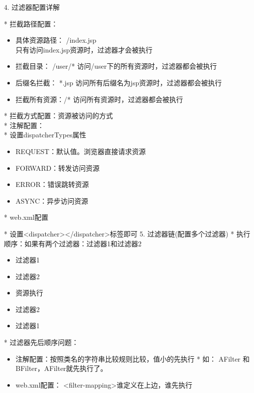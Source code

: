 \documentclass{article}
\begin{document}
  4. 过滤器配置详解

    * 拦截路径配置：
     \begin{itemize}
    \item 具体资源路径： /index.jsp \\只有访问index.jsp资源时，过滤器才会被执行
    \item  拦截目录： /user/*  访问/user下的所有资源时，过滤器都会被执行
    \item 后缀名拦截： *.jsp   访问所有后缀名为jsp资源时，过滤器都会被执行
    \item 拦截所有资源：/*    访问所有资源时，过滤器都会被执行
    \end{itemize}
    * 拦截方式配置：资源被访问的方式\\
      * 注解配置：\\
        * 设置dispatcherTypes属性
          \begin{itemize}
    \item REQUEST：默认值。浏览器直接请求资源
    \item FORWARD：转发访问资源
    \item ERROR：错误跳转资源
    \item ASYNC：异步访问资源
    \end{itemize}

      * web.xml配置

        * 设置<dispatcher></dispatcher>标签即可
  5. 过滤器链(配置多个过滤器)
    * 执行顺序：如果有两个过滤器：过滤器1和过滤器2
        \begin{itemize}
    \item 过滤器1
    \item 过滤器2
    \item 资源执行
    \item 过滤器2
    \item 过滤器1  
    \end{itemize}

    * 过滤器先后顺序问题：

     \begin{itemize}
    \item 注解配置：按照类名的字符串比较规则比较，值小的先执行
        * 如： AFilter 和 BFilter，AFilter就先执行了。
    \item web.xml配置： <filter-mapping>谁定义在上边，谁先执行
    \end{itemize}
\end{document}
